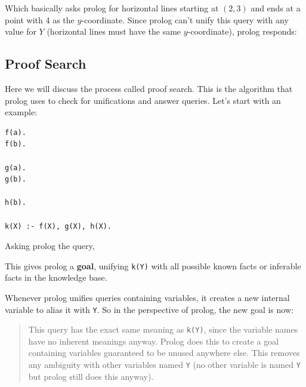 Which basically asks prolog for horizontal lines starting at \((2,3)\)
and ends at a point with \(4\) as the \(y\)-coordinate. Since prolog
can't unify this query with any value for \(Y\) (horizontal lines must
have the same \(y\)-coordinate), prolog responds:

\begin{Shaded}
\begin{Highlighting}[]
\end{Highlighting}
\end{Shaded}

\subsection{Proof
Search}\label{logic-programming-paradigm.md__proof-search}

Here we will discuss the process called proof search. This is the
algorithm that prolog uses to check for unifications and answer queries.
Let's start with an example:

\begin{verbatim}
f(a).
f(b).

g(a).
g(b).

h(b).

k(X) :- f(X), g(X), h(X). 
\end{verbatim}

Asking prolog the query,

\begin{Shaded}
\begin{Highlighting}[]
\NormalTok{)}
\end{Highlighting}
\end{Shaded}

This gives prolog a \textbf{goal}, unifying \texttt{k(Y)} with all
possible known facts or inferable facts in the knowledge base.

Whenever prolog unifies queries containing variables, it creates a new
internal variable to alias it with \texttt{Y}. So in the perspective of
prolog, the new goal is now:

\begin{Shaded}
\begin{Highlighting}[]
\NormalTok{)}
\end{Highlighting}
\end{Shaded}

\begin{quote}
This query has the exact same meaning as \texttt{k(Y)}, since the
variable names have no inherent meanings anyway. Prolog does this to
create a goal containing variables guaranteed to be unused anywhere
else. This removes any ambiguity with other variables named \texttt{Y}
(no other variable is named \texttt{Y} but prolog still does this
anyway).
\end{quote}

